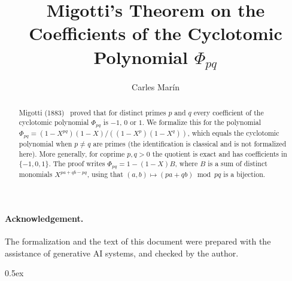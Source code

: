 \documentclass[10pt,a4paper]{article}
\begin{document}
\title{Migotti's Theorem on the Coefficients of the Cyclotomic Polynomial \(\Phi_{pq}\)}
\author{Carles Mar\'in}
\maketitle

\begin{abstract}
Migotti (1883)~\cite{Migotti1883} proved that for distinct primes $p$ and $q$ every coefficient of the
cyclotomic polynomial $\Phi_{pq}$ is $-1$, $0$ or $1$. We formalize this for the polynomial
$\Phi_{pq} = (1-X^{pq})(1-X)/((1-X^p)(1-X^q))$, which equals the cyclotomic polynomial when $p\neq q$ are primes
(the identification is classical and is not formalized here). More generally, for coprime $p,q>0$ the quotient is
exact and has coefficients in $\{-1,0,1\}$. The proof writes $\Phi_{pq}=1-(1-X)B$, where $B$ is a sum of distinct
monomials $X^{pa+qb-pq}$, using that $(a,b)\mapsto (pa+qb)\bmod pq$ is a bijection.
\end{abstract}

\paragraph{Acknowledgement.} The formalization and the text of this document were prepared with the
assistance of generative AI systems, and checked by the author.

\tableofcontents

\parindent 0pt\parskip 0.5ex





\end{document}
